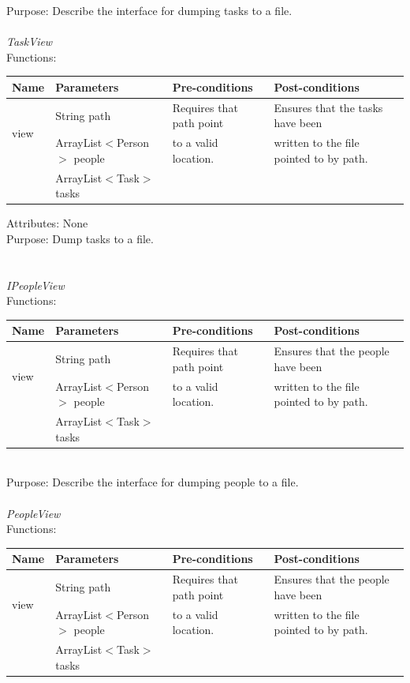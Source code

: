 Purpose: Describe the interface for dumping tasks to a file.
\\
\\
\emph{TaskView}\\
Functions:\\
\begin{tabular}{| l | l | l | l |}
\hline
Name & Parameters & Pre-conditions & Post-conditions\\
\hline
\multirow{2}{*}{view} & String path                                 & Requires that path point & Ensures that the tasks have been\\ 
			 & ArrayList$<$Person$>$ people & to a valid location.          & written to the file pointed to by path.\\ 
                                     & ArrayList$<$Task$>$ tasks       &                                         & 
\\
\hline
\end{tabular}

Attributes: None\\
Purpose: Dump tasks to a file.\\
\\
\\
\emph{IPeopleView}\\
Functions:\\
\begin{tabular}{| l | l | l | l |}
\hline
Name & Parameters & Pre-conditions & Post-conditions\\
\hline
\multirow{2}{*}{view} & String path                                 & Requires that path point & Ensures that the people have been\\ 
			 & ArrayList$<$Person$>$ people & to a valid location.          & written to the file pointed to by path.\\ 
                                     & ArrayList$<$Task$>$ tasks       &                                         & 
\\
\hline
\end{tabular}\\
Purpose: Describe the interface for dumping people to a file.
\\
\\
\emph{PeopleView}\\
Functions:\\
\begin{tabular}{| l | l | l | l |}
\hline
Name & Parameters & Pre-conditions & Post-conditions\\
\hline
\multirow{2}{*}{view} & String path                                 & Requires that path point & Ensures that the people have been\\ 
			 & ArrayList$<$Person$>$ people & to a valid location.          & written to the file pointed to by path.\\ 
                                     & ArrayList$<$Task$>$ tasks       &                                         & 
\\
\hline
\end{tabular}

